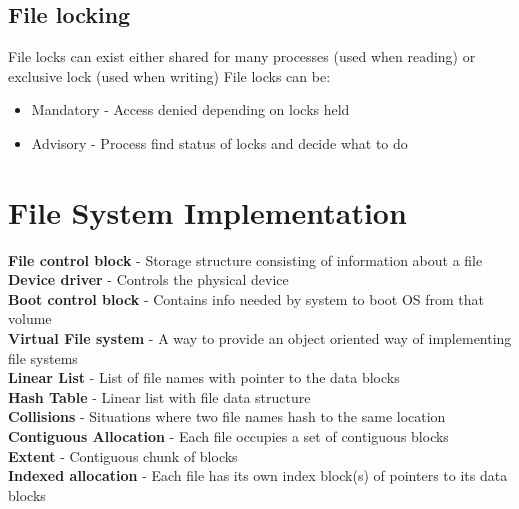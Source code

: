 \documentclass{article}[18pt]
\begin{document}
\subsection{File locking}
File locks can exist either shared for many processes (used when reading) or exclusive lock (used when writing)
File locks can be:
\begin{itemize}
	\item Mandatory - Access denied depending on locks held
	\item Advisory - Process find status of locks and decide what to do
\end{itemize}
\section{File System Implementation}
\textbf{File control block} - Storage structure consisting of information about a file\\
\textbf{Device driver} - Controls the physical device\\
\textbf{Boot control block} - Contains info needed by system to boot OS from that volume\\
\textbf{Virtual File system} - A way to provide an object oriented way of implementing file systems\\
\textbf{Linear List} - List of file names with pointer to the data blocks\\
\textbf{Hash Table} - Linear list with file data structure\\
\textbf{Collisions} - Situations where two file names hash to the same location\\
\textbf{Contiguous Allocation} - Each file occupies a set of contiguous blocks\\
\textbf{Extent} - Contiguous chunk of blocks\\
\textbf{Indexed allocation} - Each file has its own index block(s) of pointers to its data blocks
\end{document}
